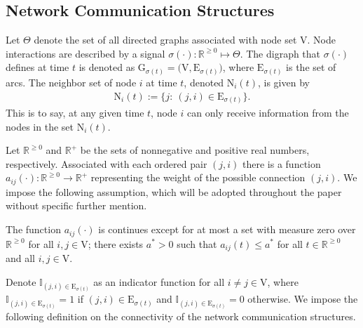\documentclass[a4paper, 11pt]{article}
\begin{document}
\subsection{Network Communication Structures}
Let $\Theta$ denote the set of all directed graphs associated with node set $\mathrm{V}$. Node interactions are described by a  signal $\sigma(\cdot): \mathbb{R}^{\geq 0}\mapsto \Theta$.
The digraph that $\sigma(\cdot)$ defines at time $t$ is denoted as $\mathrm{G}_{\sigma(t)}=\big(\mathrm{V}, \mathrm{E}_{\sigma(t)}\big)$, where $\mathrm{E}_{\sigma(t)}$ is the set of arcs. The neighbor set of node $i$ at time $t$, denoted $\mathrm{N}_i(t)$, is given by
\begin{align*}
\mathrm{N}_i(t):= \Big\{j:\ (j,i)\in\mathrm{E}_{\sigma(t)} \Big\}.
\end{align*}
This is to say, at any given time $t$, node $i$ can only receive information from the nodes in the set $\mathrm{N}_i(t)$.

Let $\mathbb{R}^{\geq 0}$ and $\mathbb{R}^+$ be the sets of nonnegative and positive real numbers, respectively. Associated with each ordered pair $(j,i)$ there is a function $a_{ij}(\cdot): \mathbb{R}^{\geq 0} \rightarrow \mathbb{R}^+$ representing the weight of the possible connection $(j,i)$. We impose the following assumption, which will be adopted throughout the paper without specific  further mention.

\medskip

 The function $a_{ij}(\cdot)$ is continues except for at most a set with measure zero over $\mathbb{R}^{\geq 0}$ for all $i,j\in\mathrm{V}$; there exists $a^\ast>0$ such that $ a_{ij}(t)\leq a^\ast$ for all $t\in \mathbb{R}^{\geq 0}$ and all $i,j\in\mathrm{V}$.

\medskip




Denote $\mathbb{I}_{(j,i)\in \mathrm{E}_{\sigma(t)}}$ as an indicator function for all $i\neq j\in \mathrm{V}$, where  $\mathbb{I}_{(j,i)\in \mathrm{E}_{\sigma(t)}}=1$ if $(j,i)\in \mathrm{E}_{\sigma(t)}$ and $\mathbb{I}_{(j,i)\in \mathrm{E}_{\sigma(t)}}=0$ otherwise.  We impose the following definition on the connectivity of the network communication structures.
\end{document}
